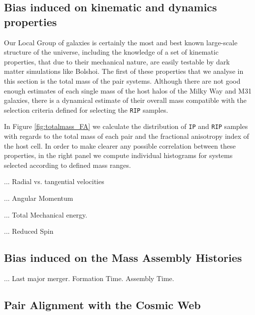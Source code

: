 \documentclass[a4,useAMS,usenatbib,usegraphicx]{latex/mn2e}
\begin{document}
\subsection{Bias induced on kinematic and dynamics properties}
\label{subsec:bias_kinematic}



Our Local Group of galaxies is certainly the most and best known 
large-scale structure of the universe, including the knowledge of a set of
kinematic properties, that due to their mechanical nature, are easily 
testable by dark matter simulations like Bolshoi. The first of these 
properties that we analyse in this section is the total mass of the pair 
systems. Although there are not good enough estimates of each single mass 
of the host halos of the Milky Way and M31 galaxies, there is a dynamical 
estimate of their overall mass  compatible with the 
selection criteria defined for selecting the \texttt{RIP} samples.



In Figure \ref{fig:totalmass_FA} we calculate the distribution of 
\texttt{IP} and \texttt{RIP} samples with regards to the total mass of 
each pair and the fractional anisotropy index of the host cell. In order
to make clearer any possible correlation between these properties, in the
right panel we compute individual histograms for systems selected according 
to defined mass ranges.


... Radial vs. tangential velocities

... Angular Momentum

... Total Mechanical energy.

... Reduced Spin


\subsection{Bias induced on the Mass Assembly Histories}
\label{subsec:bias_MAH}

... Last major merger. Formation Time. Assembly Time.

\subsection{Pair Alignment with the Cosmic Web}
\label{subsec:alignment_cosmic_web}
\end{document}
